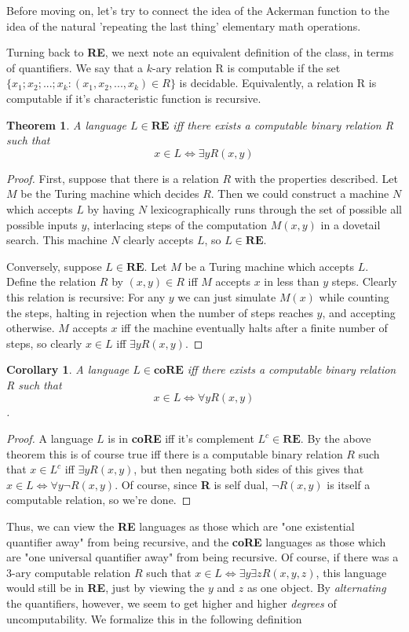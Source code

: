 \documentclass{article}
\theoremstyle{definition}
\theoremstyle{plain}
\theoremstyle{theorem}
\newtheorem{theorem}{Theorem}[section]
\newtheorem{corollary}{Corollary}[section]
\begin{document}
Before moving on, let's try to connect the idea of the Ackerman function to the idea of the natural 'repeating the last thing' elementary math operations. 
\par Turning back to \textbf{RE}, we next note an equivalent definition of the class, in terms of quantifiers. We say that a $k$-ary relation R is computable if the set $\{x_1;x_2;...;x_k: (x_1,x_2,...,x_k) \in R\}$ is decidable. Equivalently, a relation R is computable if it's characteristic function is recursive.
\begin{theorem}
    A language $L \in \textbf{RE}$ iff there exists a computable binary relation R such that 
    \[ x \in L \iff \exists y R(x,y) \]
\end{theorem}
\begin{proof}
    First, suppose that there is a relation $R$ with the properties described. Let $M$ be the Turing machine which decides $R$. Then we could construct a machine $N$ which accepts $L$ by having $N$ lexicographically runs through the set of possible all possible inputs $y$, interlacing steps of the computation $M(x,y)$ in a dovetail search. This machine $N$ clearly accepts $L$, so $L \in \textbf{RE}$.
    \par Conversely, suppose $L \in \textbf{RE}$. Let $M$ be a Turing machine which accepts $L$. Define the relation $R$ by $(x,y) \in R$ iff $M$ accepts $x$ in less than $y$ steps. Clearly this relation is recursive: For any $y$ we can just simulate $M(x)$ while counting the steps, halting in rejection when the number of steps reaches $y$, and accepting otherwise. $M$ accepts $x$ iff the machine eventually halts after a finite number of steps, so clearly $x \in L$ iff $\exists y R(x,y)$.
\end{proof}
\begin{corollary}
    A language $L \in \textbf{coRE}$ iff there exists a computable binary relation R such that \[ x \in L \iff \forall y R(x,y) \].
\end{corollary}
\begin{proof}
    A language $L$ is in \textbf{coRE} iff it's complement $L^c \in \textbf{RE}$. By the above theorem this is of course true iff there is a computable binary relation $R$ such that $x \in L^c$ iff $\exists y R(x,y)$, but then negating both sides of this gives that $x \in L \iff \forall y \neg R(x,y)$. Of course, since \textbf{R} is self dual, $\neg R(x,y)$ is itself a computable relation, so we're done.
\end{proof}
Thus, we can view the \textbf{RE} languages as those which are "one existential quantifier away" from being recursive, and the \textbf{coRE} languages as those which are "one universal quantifier away" from being recursive. Of course, if there was a $3$-ary computable relation $R$ such that $x \in L \iff \exists y \exists z R(x,y,z)$, this language would still be in \textbf{RE}, just by viewing the $y$ and $z$ as one object. By \textit{alternating} the quantifiers, however, we seem to get higher and higher \textit{degrees} of uncomputability. We formalize this in the following definition
\end{document}
